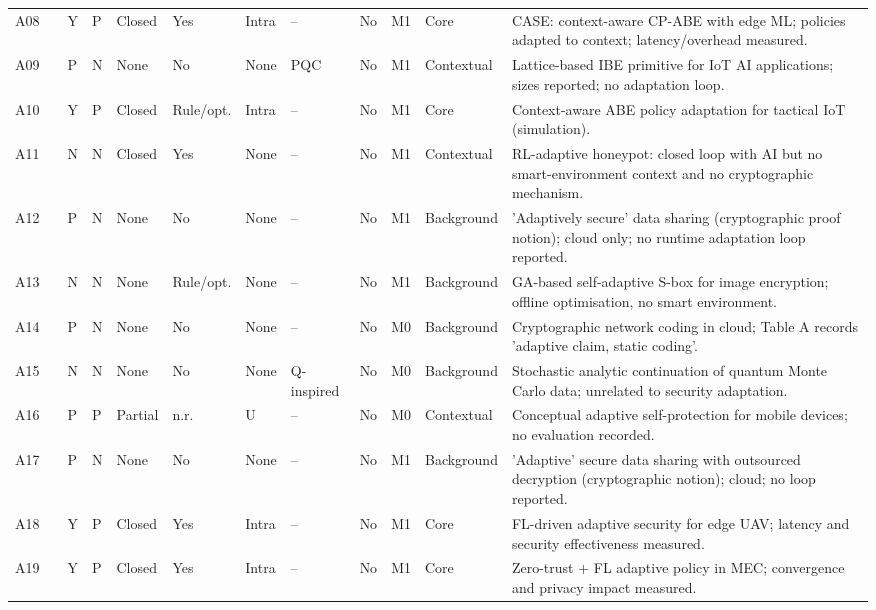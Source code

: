 {\begin{longtable}{p{0.43cm}p{0.8cm}p{0.3cm}p{0.4cm}p{0.8cm}p{0.75cm}p{0.65cm}p{0.8cm}p{0.8cm}p{0.45cm}p{1.1cm}p{4.95cm}}
A08 & \cite{9501039} & Y & P & Closed & Yes & Intra & -- & No & M1 & Core & CASE: context-aware CP-ABE with edge ML; policies adapted to context; latency/overhead measured. \\
A09 & \cite{https://doi.org/10.1155/2022/5498058} & P & N & None & No & None & PQC & No & M1 & Contextual & Lattice-based IBE primitive for IoT AI applications; sizes reported; no adaptation loop. \\
A10 & \cite{10017647} & Y & P & Closed & Rule/opt. & Intra & -- & No & M1 & Core & Context-aware ABE policy adaptation for tactical IoT (simulation). \\
A11 & \cite{app12105224} & N & N & Closed & Yes & None & -- & No & M1 & Contextual & RL-adaptive honeypot: closed loop with AI but no smart-environment context and no cryptographic mechanism. \\
A12 & \cite{10219564} & P & N & None & No & None & -- & No & M1 & Background & 'Adaptively secure' data sharing (cryptographic proof notion); cloud only; no runtime adaptation loop reported. \\
A13 & \cite{10003194} & N & N & None & Rule/opt. & None & -- & No & M1 & Background & GA-based self-adaptive S-box for image encryption; offline optimisation, no smart environment. \\
A14 & \cite{10083532} & P & N & None & No & None & -- & No & M0 & Background & Cryptographic network coding in cloud; Table A records 'adaptive claim, static coding'. \\
A15 & \cite{SHAO20231} & N & N & None & No & None & Q-inspired & No & M0 & Background & Stochastic analytic continuation of quantum Monte Carlo data; unrelated to security adaptation. \\
A16 & \cite{Ahmad2023} & P & P & Partial & n.r. & U & -- & No & M0 & Contextual & Conceptual adaptive self-protection for mobile devices; no evaluation recorded. \\
A17 & \cite{10269044} & P & N & None & No & None & -- & No & M1 & Background & 'Adaptive' secure data sharing with outsourced decryption (cryptographic notion); cloud; no loop reported. \\
A18 & \cite{10622352} & Y & P & Closed & Yes & Intra & -- & No & M1 & Core & FL-driven adaptive security for edge UAV; latency and security effectiveness measured. \\
A19 & \cite{10942760} & Y & P & Closed & Yes & Intra & -- & No & M1 & Core & Zero-trust + FL adaptive policy in MEC; convergence and privacy impact measured. \\

\end{longtable}}
